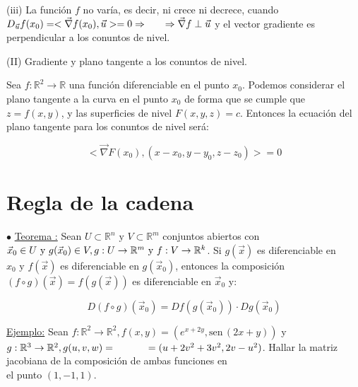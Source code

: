 \documentclass[10pt, titlepage]{article}
\newcommand{\R}{\mathbb{R}}
\newcommand{\teorema}[1][\!\!]{\noindent$\bullet$ \underline{Teorema #1:} }
\newcommand{\dindent}{\indent\indent}
\newcommand{\sen}[1]{\text{sen}\,{#1}}
\begin{document}
(iii) La función $f$ no varía, es decir, ni crece ni decrece, cuando $D_{\vec{u}} f (x_0) = < \vec{\nabla} f 
(x_0), \vec{u} > = 0 \Rightarrow \\ \indent \Rightarrow \vec{\nabla} f \perp \vec{u}$ y el vector gradiente 
es perpendicular a los conuntos de nivel.
\vspace{5mm}


\noindent (II) Gradiente y plano tangente a los conuntos de nivel.
\vspace{3mm}

Sea $f : \R^2 \to \R$ una función diferenciable en el punto $x_0$. Podemos considerar el plano tangente a 
la \indent curva en el punto $x_0$ de forma que se cumple que $z = f (x, y)$, y las superficies de nivel 
$F (x, y, z) = c$. \indent Entonces la ecuación del plano tangente para los conuntos de nivel será:
\vspace{3mm}

\[
\boxed{
< \vec{\nabla} F (x_0), (x - x_0, y - y_0, z - z_0) > = 0
}
\]
\vspace{7mm}


\section{Regla de la cadena}
\vspace{5mm}

\teorema Sean $U \subset \R^n \text{ y } V \subset \R^m$ conjuntos abiertos con $\vec{x}_0 \in U 
\text{ y } g (\vec{x}_0) \in V, g : U \to \R^m \text{ y } \\ f  : V \to \R^k$. Si $g (\vec{x})$ es diferenciable 
en $x_0 \text{ y } f (\vec{x})$ es diferenciable en $g (\vec{x}_0)$, entonces la composición $(f \circ g) 
(\vec{x}) = f (g (\vec{x}))$ es diferenciable en $\vec{x}_0$ y:
\vspace{3mm}

\[
\boxed{
D (f \circ g) (\vec{x}_0) = Df (g (\vec{x}_0)) \cdot Dg (\vec{x}_0)
}
\]
\vspace{7mm}

\dindent\underline{Ejemplo:} Sean $f : \R^2 \to \R^2, f (x, y) = (e^{x + 2y}, \sen{(2x + y)})$ y 
$g : \R^3 \to \R^2, g (u, v, w) = \\ \dindent = (u + 2v^2 + 3v^2, 2v - u^2)$. Hallar la matriz jacobiana de
la composición de ambas funciones en \\ \dindent el punto $(1, -1, 1)$.
\vspace{3mm}
\end{document}
